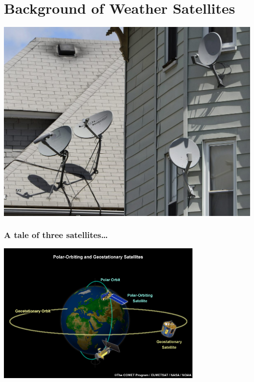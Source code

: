 \documentclass[]{beamer}
\begin{document}
\section[Background]{Background of Weather Satellites}
\begin{frame}
    \includegraphics[]{images/dish.jpg}
\end{frame}
\begin{frame}
    \frametitle{A tale of three satellites\dots}
    \begin{center}
        \includegraphics[height=7cm,keepaspectratio]{images/polar-vs-geo-satellites.jpg}
    \end{center}
\end{frame}
\end{document}
